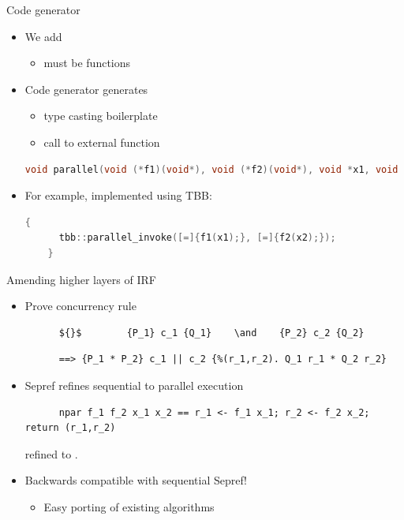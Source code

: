\documentclass[fleqn]{beamer}
\begin{document}
\begin{frame}[fragile]{Code generator}
  \begin{itemize}
   \item<+-> We add 
    \begin{itemize}
     \item {} must be functions
    \end{itemize}
   \item<+-> Code generator generates
    \begin{itemize}
     \item type casting boilerplate
     \item call to external  function

    \end{itemize}
    {\small
    \begin{lstlisting}[language=C++]
    void parallel(void (*f1)(void*), void (*f2)(void*), void *x1, void *x2)
    \end{lstlisting}
    }
   \item<+-> For example, implemented using TBB:
    {\small
    \begin{lstlisting}[language=C++]
    {
      tbb::parallel_invoke([=]{f1(x1);}, [=]{f2(x2);});
    }
    \end{lstlisting}
    }



  \end{itemize}
\end{frame}
\begin{frame}[fragile]{Amending higher layers of IRF}
  \begin{itemize}
   \item<+-> Prove concurrency rule
    \begin{lstlisting}
      ${}$        {P_1} c_1 {Q_1}    \and    {P_2} c_2 {Q_2}
    \end{lstlisting}

    \vspace*{-.8em}
    \begin{lstlisting}
      ==> {P_1 * P_2} c_1 || c_2 {%(r_1,r_2). Q_1 r_1 * Q_2 r_2}
    \end{lstlisting}

   \item<+-> Sepref refines sequential to parallel execution
    \begin{lstlisting}
      npar f_1 f_2 x_1 x_2 == r_1 <- f_1 x_1; r_2 <- f_2 x_2; return (r_1,r_2)
    \end{lstlisting}
    refined to .

   \item<+-> Backwards compatible with sequential Sepref!
    \begin{itemize}
     \item Easy porting of existing algorithms

    \end{itemize}
  \end{itemize}
\end{frame}
\end{document}
